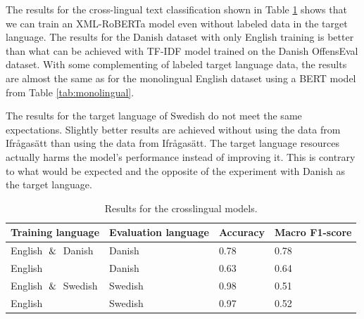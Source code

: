 \documentclass[nofilelist]{cslthse-msc}
\begin{document}

The results for the cross-lingual text classification shown in Table \ref{tab:crosslingual} shows that we can train an XML-RoBERTa model even without labeled data in the target language. The results for the Danish dataset with only English training is better than what can be achieved with TF-IDF model trained on the Danish OffensEval dataset. With some complementing of labeled target language data, the results are almost the same as for the monolingual English dataset using a BERT model from Table \ref{tab:monolingual}.

The results for the target language of Swedish do not meet the same expectations. Slightly better results are achieved without using the data from Ifrågasätt than using the data from Ifrågasätt. The target language resources actually harms the model's performance instead of improving it. This is contrary to what would be expected and the opposite of the experiment with Danish as the target language. 

\begin{table}[t]
\centering
\begin{tabular}{@{}llll@{}}
\toprule
Training language & Evaluation language & Accuracy & Macro F1-score  \\ \midrule
English $\And$ Danish & Danish & 0.78 & 0.78 \\
English & Danish & 0.63 & 0.64 \\
English $\And$ Swedish & Swedish & 0.98 & 0.51 \\
English & Swedish & 0.97 & 0.52 \\
\bottomrule
\end{tabular}
\caption{Results for the crosslingual models.}
\label{tab:crosslingual}
\end{table}
\end{document}
